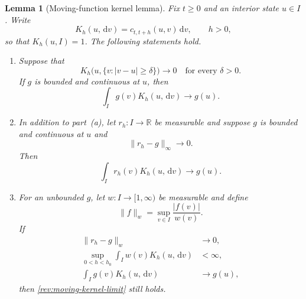 \documentclass[11pt]{article}
\newtheorem{lemma}[definition]{Lemma}
\theoremstyle{remark}
\newcommand{\R}{\mathbb R}
\newcommand{\dd}{\,\mathrm d}
\begin{document}
\begin{lemma}[Moving-function kernel lemma]
\label{rev:app-kernel-lemma}
Fix $t\ge0$ and an interior state $u\in I$.  Write
\[
K_h(u,\dd v)=c_{t,t+h}(u,v)\dd v,
\qquad h>0,
\]
so that $K_h(u,I)=1$.  The following statements hold.
\begin{enumerate}[label=(\alph*)]
\item Suppose that
\begin{equation}
K_h\bigl(u,\{v:|v-u|\ge\delta\}\bigr)\longrightarrow0
\quad\text{for every }\delta>0.
\label{rev:kernel-stochastic-continuity}
\end{equation}
If $g$ is bounded and continuous at $u$, then
\begin{equation}
\int_Ig(v)K_h(u,\dd v)\longrightarrow g(u).
\label{rev:kernel-fixed-function-limit}
\end{equation}
\item In addition to part~(a), let $r_h:I\to\R$ be measurable and suppose
$g$ is bounded and continuous at $u$ and
\begin{equation}
\lVert r_h-g\rVert_\infty\longrightarrow0.
\label{rev:moving-uniform-limit}
\end{equation}
Then
\begin{equation}
\int_Ir_h(v)K_h(u,\dd v)\longrightarrow g(u).
\label{rev:moving-kernel-limit}
\end{equation}
\item For an unbounded $g$, let $w:I\to[1,\infty)$ be measurable and define
\[
\lVert f\rVert_w=\sup_{v\in I}\frac{|f(v)|}{w(v)}.
\]
If
\begin{align}
\lVert r_h-g\rVert_w&\longrightarrow0,
\label{rev:moving-weighted-limit}\\
\sup_{0<h<h_0}\int_Iw(v)K_h(u,\dd v)&<\infty,
\label{rev:kernel-weight-bound}\\
\int_Ig(v)K_h(u,\dd v)&\longrightarrow g(u),
\label{rev:weighted-strong-continuity}
\end{align}
then \eqref{rev:moving-kernel-limit} still holds.
\end{enumerate}
\end{lemma}
\end{document}
